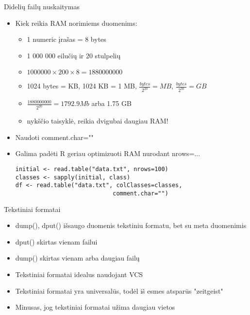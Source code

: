 \documentclass[11pt,xcolor=table]{beamer}
\begin{document}
\begin{frame}[fragile]{Didelių failų nuskaitymas}
\begin{itemize}
\item Kiek reikia RAM norimiems duomenims:
\begin{itemize}
\item 1 numeric įrašas = 8 bytes
\item 1 000 000 eilučių ir 20 stulpelių 
\item $1000000 \times 200 \times 8=1880000000$
\item 1024 bytes = KB, 1024 KB = 1 MB, $\frac{bytes}{2^{20}}=MB$, $\frac{bytes}{2^{30}}=GB$
\item $\frac{1880000000}{2^{20}}=1792.9Mb$ arba 1.75 GB
\item nykščio taisyklė, reikia dvigubai daugiau RAM!
\end{itemize}
\item Naudoti comment.char=""
\item Galima padėti R geriau optimizuoti RAM nurodant nrows=...
\begin{lstlisting}
initial <- read.table("data.txt", nrows=100)
classes <- sapply(initial, class)
df <- read.table("data.txt", colClasses=classes,
							comment.char="")
\end{lstlisting}
\end{itemize}
\end{frame}

\begin{frame}[fragile]{Tekstiniai formatai}
\begin{itemize}
\item dump(), dput() išsaugo duomenis tekstiniu formatu, bet su meta duomenimis
\item dput() skirtas vienam failui
\item dump() skirtas vienam arba daugiau failų
\item Tekstiniai formatai idealus naudojant VCS
\item Tekstiniai formatai yra universalūs, todėl iš esmes atsparūs "zeitgeist"
\item Minusas, jog tekstiniai formatai užima daugiau vietos
\begin{lstlisting}
\end{lstlisting}
\end{itemize}
\end{frame}
\end{document}
